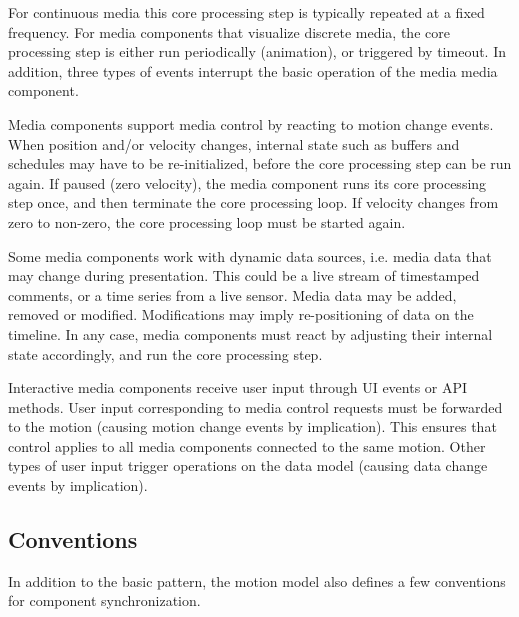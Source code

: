 For continuous media this core processing step is typically repeated at a
fixed frequency. For media components that visualize discrete media, the core
processing step is either run periodically (animation), or triggered by
timeout. In addition, three types of events interrupt the basic operation of
the media media component.


Media components support media control by reacting to motion change events.
When position and/or velocity changes, internal state such as buffers and
schedules may have to be re-initialized, before the core processing step can
be run again. If paused (zero velocity), the media component runs its core
processing step once, and then terminate the core processing loop. If velocity
changes from zero to non-zero, the core processing loop must be started again.


Some media components work with dynamic data sources, i.e. media data that may
change during presentation. This could be a live stream of timestamped
comments, or a time series from a live sensor. Media data may be added,
removed or modified. Modifications may imply re-positioning of data on the
timeline. In any case, media components must react by adjusting their internal
state accordingly, and run the core processing step.


Interactive media components receive user input through UI events or API
methods. User input corresponding to media control requests must be forwarded
to the motion (causing motion change events by implication). This ensures that
control applies to all media components connected to the same motion. Other
types of user input trigger operations on the data model (causing data change
events by implication).

\subsection{Conventions}

In addition to the basic pattern, the motion model also defines a few
conventions for component synchronization.


